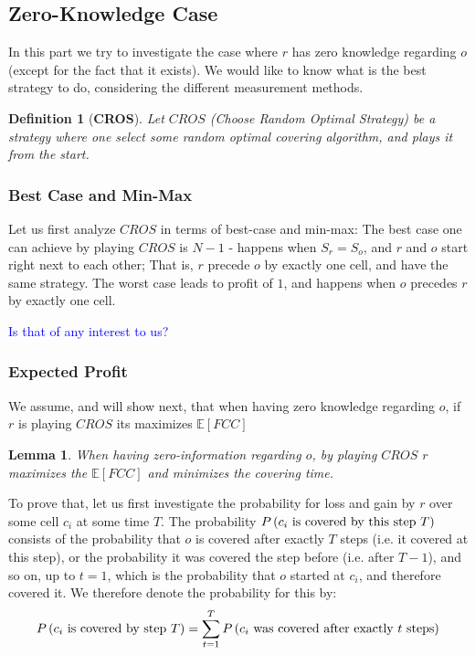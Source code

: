 \documentclass[a4paper,10pt]{article}
\newtheorem{lemma}[theorem]{Lemma}
\newtheorem{definition}{Definition}
\newcommand\rob{\ensuremath{r}\xspace}
\newcommand\opp{\ensuremath{o}\xspace}
\newcommand{\fcc}{\ensuremath{FCC}\xspace}
\newcommand{\cros}{\ensuremath{CROS}\xspace}
\begin{document}
\subsection{Zero-Knowledge Case}\label{subsubsections:ZeroKnowledge}
In this part we try to investigate the case where \rob has zero knowledge regarding \opp (except for the fact that it exists). We would like to know what is the best strategy to do, considering the different measurement methods.

\begin{definition}[\textbf{CROS}]
Let \textbf{\cros} (Choose Random Optimal Strategy) be a strategy where one select some random optimal covering algorithm, and plays it from the start. 
\end{definition}

\subsubsection{Best Case and Min-Max}
Let us first analyze \cros in terms of best-case and min-max:
The best case one can achieve by playing \cros is $N-1$ - happens when $S_{\rob} = S_{\opp}$, and \rob and \opp start right next to each other; That is, \rob precede \opp by exactly one cell, and have the same strategy.
The worst case leads to profit of $1$, and happens when \opp precedes \rob by exactly one cell.

\textcolor{blue}{Is that of any interest to us?}

\subsubsection{Expected Profit}
We assume, and will show next, that when having zero knowledge regarding \opp, if \rob is playing \cros its maximizes $\mathbb{E}[\fcc]$

\begin{lemma}\label{lem:NoInformationEFCC}
When having zero-information regarding \opp, by playing \textbf{\cros} \rob maximizes the $\mathbb{E}\left[\fcc\right]$ and minimizes the covering time.
\end{lemma}

To prove that, let us first investigate the probability for loss and gain by \rob over some cell $c_i$ at some time $T$.
The probability $P\left(\textnormal{$c_i$ is covered by this step $T$}\right)$ consists of the probability that \opp is covered after exactly $T$ steps (i.e. it covered at this step), or the probability it was covered the step before (i.e. after $T-1$), and so on, up to $t=1$, which is the probability that \opp started at $c_i$, and therefore covered it.
We therefore denote the probability for this by:
\[P\left(\textnormal{$c_i$ is covered by step $T$}\right)=\sum_{t=1}^{T}{P\left(\textnormal{$c_i$ was covered after exactly $t$ steps}\right)}\]
\end{document}
